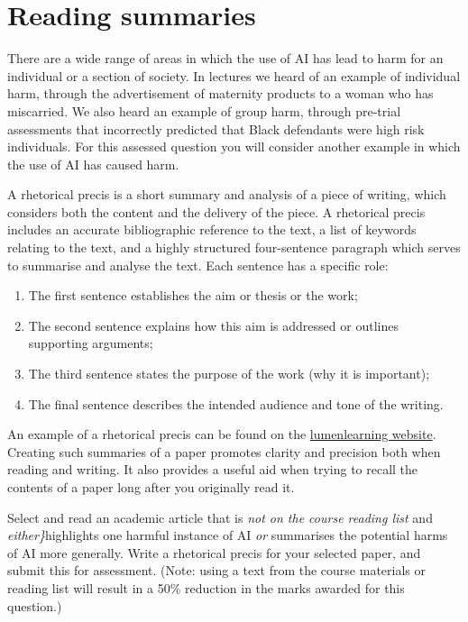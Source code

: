\documentclass[
]{book}
\providecommand{\tightlist}{%
  \setlength{\itemsep}{0pt}\setlength{\parskip}{0pt}}
\theoremstyle{definition}
\theoremstyle{definition}
\theoremstyle{definition}
\theoremstyle{definition}
\theoremstyle{remark}
\begin{document}
\hypertarget{reading-summaries}{%
\section{Reading summaries}\label{reading-summaries}}

There are a wide range of areas in which the use of AI has lead to harm
for an individual or a section of society. In lectures we heard of an
example of individual harm, through the advertisement of maternity
products to a woman who has miscarried. We also heard an example of
group harm, through pre-trial assessments that incorrectly predicted
that Black defendants were high risk individuals. For this assessed
question you will consider another example in which the use of AI has
caused harm.

A rhetorical precis is a short summary and analysis of a piece of
writing, which considers both the content and the delivery of the piece.
A rhetorical precis includes an accurate bibliographic reference to the
text, a list of keywords relating to the text, and a highly structured
four-sentence paragraph which serves to summarise and analyse the text.
Each sentence has a specific role:

\begin{enumerate}
\def\labelenumi{\arabic{enumi}.}
\tightlist
\item
  The first sentence establishes the aim or thesis or the work;
\item
  The second sentence explains how this aim is addressed or outlines
  supporting arguments;
\item
  The third sentence states the purpose of the work (why it is
  important);
\item
  The final sentence describes the intended audience and tone of the
  writing.
\end{enumerate}

An example of a rhetorical precis can be found on the \href{https://courses.lumenlearning.com/englishcomp2kscopex92x2/chapter/rhetorical-precis/}{lumenlearning
website}.
Creating such summaries of a paper promotes clarity and precision both
when reading and writing. It also provides a useful aid when trying to
recall the contents of a paper long after you originally read it.

Select and read an academic article that is \emph{not on the course reading
list} and \emph{either\}}highlights one harmful instance of AI \emph{or} summarises
the potential harms of AI more generally. Write a rhetorical precis for
your selected paper, and submit this for assessment. (Note: using a text
from the course materials or reading list will result in a 50\% reduction
in the marks awarded for this question.)
\end{document}
